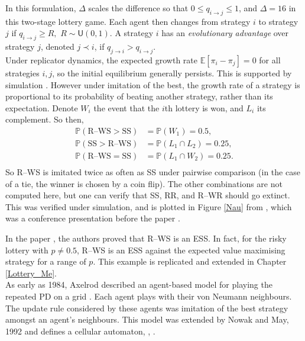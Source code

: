In this formulation, $\Delta$ scales the difference so that $0 \leq q_{i\to j} \leq 1$, and $\Delta = 16$ in this two-stage lottery game. Each agent then changes from strategy $i$ to strategy $j$ if $q_{i\to j} \geq R,$ $R  \sim \mathsf{U}(0,1)$. A strategy $i$ has an \emph{evolutionary advantage} over strategy $j$, denoted $j \prec i$, if $q_{j \to i} >q_{i \to j}$.    \\


Under replicator dynamics, the expected growth rate $\mathbb E[\pi_i - \pi_j] = 0$ for all strategies $i,j$, so the initial equilibrium generally persists. This is supported by simulation \cite{RN30}. However under imitation of the best, the growth rate of a strategy is proportional to its probability of beating another strategy, rather than its expectation. Denote $W_i$ the event that the $i$th lottery is won, and $L_i$ its complement. So then,\\
\begin{align*}
    \mathbb P(\textrm{R--WS}> \textrm{SS}) &= \mathbb P(W_1) = 0.5, \\
    \mathbb P(\textrm{SS}>\textrm{R--WS}) &= \mathbb P(L_1 \cap L_2) = 0.25, \\
    \mathbb P(\textrm{R--WS} = \textrm{SS}) &= \mathbb P(L_1 \cap W_2) = 0.25.\\
\end{align*}
So R--WS is imitated twice as often as SS under pairwise comparison (in the case of a tie, the winner is chosen by a coin flip). The other combinations are not computed here, but one can verify that SS, RR, and R--WR should go extinct. This was verified under simulation, and is plotted in Figure \ref{Nau} from \cite{RN24}, which was a conference presentation before the paper \cite{RN30}. 

In the paper \cite{RN30}, the authors proved that R--WS is an ESS. In fact, for the risky lottery with $p \neq 0.5$, R--WS is an ESS against the expected value maximising strategy for a range of $p$. This example is replicated and extended in Chapter \ref{Lottery_Me}. \\


As early as 1984, Axelrod described an agent-based model for playing the repeated PD on a grid \cite{RN63}. Each agent plays with their von Neumann neighbours. The update rule considered by these agents was imitation of the best strategy amongst an agent's neighbours. This model was extended by Nowak and May, 1992 and defines a cellular automaton, \cite{RN63}, \cite{RN70}. \\



